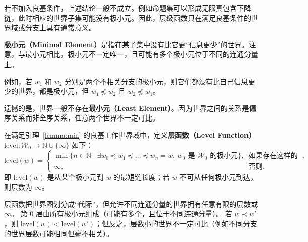 \begin{remark}
    若不加入良基条件，上述结论一般不成立。例如命题集可以形成无限真包含下降链，此时相应的世界子集可能没有极小元。因此，层级函数只在满足良基条件的世界域或分支上具有通常意义。
\end{remark}

\begin{remark}
    \textbf{极小元（Minimal Element）}是指在某子集中没有比它更“信息更少”的世界。注意，与最小元相比，极小元不一定唯一，且可能有多个极小元位于不同的连通分量上。

    例如，若 $w_1$ 和 $w_2$ 分别是两个不相关分支的极小元，则它们都没有比自己信息更少的世界，都是极小元，但 $w_1 \not\preceq w_2$ 且 $w_2 \not\preceq w_1$。

    遗憾的是，世界一般不存在\textbf{最小元（Least Element）}。因为世界之间的关系是偏序关系而非全序关系，任意两个世界不一定可比。
\end{remark}

\begin{definition}[层函数]\label{def:level}
    在满足引理~\ref{lemma:min} 的良基工作世界域中，定义\textbf{层函数（Level Function）} $\mathrm{level}:\mathcal{W}_0\to\mathbb{N}\cup\{\infty\}$ 如下：
    \begin{equation}
        \mathrm{level}(w)=
        \begin{cases}
            \min \big\{ n \in \mathbb{N} \mid \exists w_0 \preceq w_1 \preceq \dots \preceq w_n = w,\ w_0 \text{ 是 } \mathcal{W}_0 \text{ 的极小元} \big\}, & \text{如果存在这样的链}, \\
            \infty,                                                                                                                                   & \text{否则}.
        \end{cases}
    \end{equation}
    即 $\mathrm{level}(w)$ 是从某个极小元到 $w$ 的最短链长度；若 $w$ 不可从任何极小元到达，则层数为 $\infty$。
\end{definition}

\begin{remark}
    层函数把世界图划分成“代际”，但允许不同连通分量的世界拥有任意有限的层数或 $\infty$。
    第 0 层由所有极小元组成（可能有多个，且位于不同连通分量）。
    若 $w \prec w'$，则 $\mathrm{level}(w) < \mathrm{level}(w')$；但反之，层数小的世界不一定可比（例如不同分支的世界层数可能相同但毫不相关）。
\end{remark}

